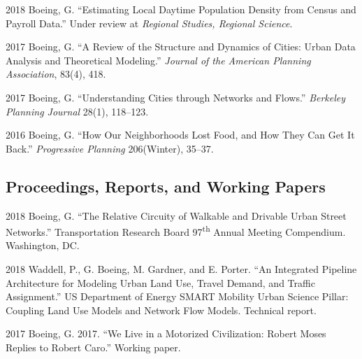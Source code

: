 \documentclass{academiccv}
\begin{document}
\begin{tablist}
	
\item[2018] \tab Boeing, G. \enquote{Estimating Local Daytime Population Density from Census and Payroll Data.} Under review at \textit{Regional Studies, Regional Science}.
	
\item[2017] \tab Boeing, G. \enquote{A Review of the Structure and Dynamics of Cities: Urban Data Analysis and Theoretical Modeling.} \textit{Journal of the American Planning Association}, 83(4), 418.
	
\item[2017] \tab Boeing, G. \enquote{Understanding Cities through Networks and Flows.} \textit{Berkeley Planning Journal} 28(1), 118--123.

\item[2016] \tab Boeing, G. \enquote{How Our Neighborhoods Lost Food, and How They Can Get It Back.} \textit{Progressive Planning} 206(Winter), 35--37.
	
\end{tablist}



\subsection*{Proceedings, Reports, and Working Papers}

\begin{tablist}

\item[2018] \tab Boeing, G. \enquote{The Relative Circuity of Walkable and Drivable Urban Street Networks.} Transportation Research Board 97\textsuperscript{th} Annual Meeting Compendium. Washington, DC.
	
\item[2018] \tab Waddell, P., G. Boeing, M. Gardner, and E. Porter. \enquote{An Integrated Pipeline Architecture for Modeling Urban Land Use, Travel Demand, and Traffic Assignment.} US Department of Energy SMART Mobility Urban Science Pillar: Coupling Land Use Models and Network Flow Models. Technical report.

\item[2017] \tab Boeing, G. 2017. \enquote{We Live in a Motorized Civilization: Robert Moses Replies to Robert Caro.} Working paper.
	
\end{tablist}
\end{document}
